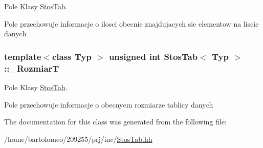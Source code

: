 Pole Klasy \hyperlink{class_stos_tab}{Stos\-Tab}. 

Pole przechowuje informacje o ilosci obecnie znajdujacych sie elementow na liscie danych \hypertarget{class_stos_tab_a4db33c7f5b5f57b4d755a1beb59852dc}{
\subsubsection[{\-\_\-\-Rozmiar\-T}]{\setlength{\rightskip}{0pt plus 5cm}template$<$class Typ $>$ unsigned int {\bf Stos\-Tab}$<$ Typ $>$\-::\-\_\-\-Rozmiar\-T\hspace{0.3cm}{\ttfamily [private]}}}\label{class_stos_tab_a4db33c7f5b5f57b4d755a1beb59852dc}


Pole Klasy \hyperlink{class_stos_tab}{Stos\-Tab}. 

Pole przechowuje informacje o obecnycm rozmiarze tablicy danych 

The documentation for this class was generated from the following file\-:\begin{DoxyCompactItemize}
\item 
/home/bartolomeo/209255/prj/inc/\hyperlink{_stos_tab_8hh}{Stos\-Tab.\-hh}\end{DoxyCompactItemize}
